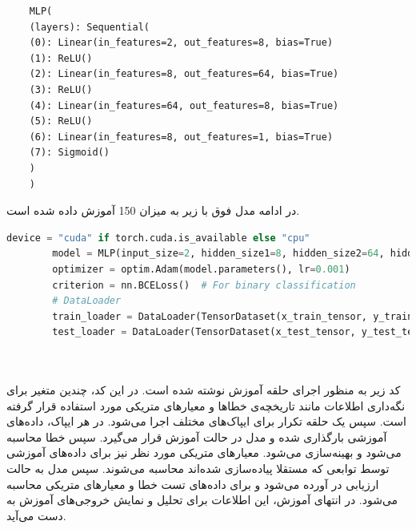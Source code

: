 \documentclass{article}
\begin{document}
\begin{LTR}
\begin{verbatim}
	MLP(
	(layers): Sequential(
	(0): Linear(in_features=2, out_features=8, bias=True)
	(1): ReLU()
	(2): Linear(in_features=8, out_features=64, bias=True)
	(3): ReLU()
	(4): Linear(in_features=64, out_features=8, bias=True)
	(5): ReLU()
	(6): Linear(in_features=8, out_features=1, bias=True)
	(7): Sigmoid()
	)
	)
\end{verbatim}
\end{LTR}
در ادامه مدل فوق با 
زیر به میزان 150 
آموزش داده شده است.
\begin{LTR}
	\begin{lstlisting}[language=Python, caption= Configuration]
		device = "cuda" if torch.cuda.is_available else "cpu"
		model = MLP(input_size=2, hidden_size1=8, hidden_size2=64, hidden_size3=8, output_size=1).to(device)
		optimizer = optim.Adam(model.parameters(), lr=0.001)		
		criterion = nn.BCELoss()  # For binary classification
		# DataLoader
		train_loader = DataLoader(TensorDataset(x_train_tensor, y_train_tensor), batch_size=128, shuffle=True)
		test_loader = DataLoader(TensorDataset(x_test_tensor, y_test_tensor), batch_size=512, shuffle=False)
				
	
	\end{lstlisting}
\end{LTR}
کد زیر به منظور اجرای حلقه آموزش نوشته شده است.
در این کد، چندین متغیر برای نگه‌داری اطلاعات مانند تاریخچه‌ی خطاها و معیارهای متریکی مورد استفاده قرار گرفته است. سپس یک حلقه تکرار برای ایپاک‌های مختلف اجرا می‌شود. در هر ایپاک، داده‌های آموزشی بارگذاری شده و مدل در حالت آموزش قرار می‌گیرد. سپس خطا محاسبه می‌شود و بهینه‌سازی می‌شود. معیارهای متریکی مورد نظر نیز برای داده‌های آموزشی توسط توابعی که مستقلا پیاده‌سازی شده‌اند محاسبه می‌شوند. سپس مدل به حالت ارزیابی در آورده می‌شود و برای داده‌های تست خطا و معیارهای متریکی محاسبه می‌شود. در انتهای آموزش، این اطلاعات برای تحلیل و نمایش خروجی‌های آموزش به دست می‌آید. 
\end{document}
